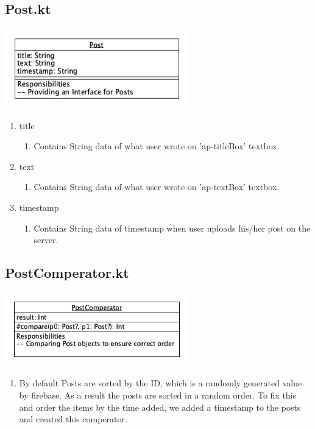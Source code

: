 \documentclass[conference]{IEEEtran}
\numberwithin{figure}{subsection}
\begin{document}
\subsection{Post.kt}
\includegraphics[width = 8cm]{bibtex/images/Post.png}
\begin{enumerate}
    \item title
        \begin{enumerate}
            \item Contains String data of what user wrote on 'ap-titleBox' textbox.
        \end{enumerate}
    \item text
        \begin{enumerate}
            \item Contains String data of what user wrote on 'ap-textBox' textbox.
        \end{enumerate}
    \item timestamp
        \begin{enumerate}
            \item Contains String data of timestamp when user uploads his/her post on the server.
        \end{enumerate}
\end{enumerate}


\subsection{PostComperator.kt}
\includegraphics[width = 8cm]{bibtex/images/PostComperator.png}
\begin{enumerate}
    \item By default Posts are sorted by the ID, which is a randomly generated value by firebase. As a result the posts are sorted in a random order. To fix this and order the items by the time added, we added a timestamp to the posts and created this comperator.
\end{enumerate}
\end{document}

